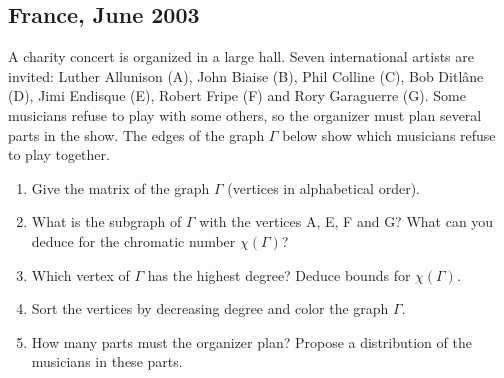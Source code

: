 \newpage
\begin{tkzexample}
\end{tkzexample}

\newpage
\subsection{France, June 2003}\label{frj03}
A charity concert is organized in a large hall. Seven international artists
are invited: Luther Allunison (A), John Biaise (B), Phil Colline (C), Bob
Ditlâne (D), Jimi Endisque (E), Robert Fripe (F) and Rory Garaguerre (G).
Some musicians refuse to play with some others, so the organizer must plan
several parts in the show. The edges of the graph $\Gamma$ below show which
musicians refuse to play together.

\begin{center}
\end{center}

\begin{enumerate}
\item Give the matrix of the graph $\Gamma$ (vertices in alphabetical
      order).
\item What is the subgraph of $\Gamma$ with the vertices A, E, F and G? What
      can you deduce for the chromatic number $\chi(\Gamma)$?
\item Which vertex of $\Gamma$ has the highest degree? Deduce bounds for
      $\chi(\Gamma)$.
\item Sort the vertices by decreasing degree and color the graph $\Gamma$.
\item How many parts must the organizer plan? Propose a distribution of the
      musicians in these parts.
\end{enumerate}

